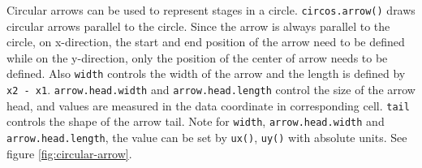 \documentclass[]{book}
\newenvironment{Shaded}{\begin{snugshade}}{\end{snugshade}}
\newcommand{\KeywordTok}[1]{\textcolor[rgb]{0.13,0.29,0.53}{\textbf{#1}}}
\newcommand{\DataTypeTok}[1]{\textcolor[rgb]{0.13,0.29,0.53}{#1}}
\newcommand{\DecValTok}[1]{\textcolor[rgb]{0.00,0.00,0.81}{#1}}
\newcommand{\FloatTok}[1]{\textcolor[rgb]{0.00,0.00,0.81}{#1}}
\newcommand{\StringTok}[1]{\textcolor[rgb]{0.31,0.60,0.02}{#1}}
\newcommand{\OtherTok}[1]{\textcolor[rgb]{0.56,0.35,0.01}{#1}}
\newcommand{\ControlFlowTok}[1]{\textcolor[rgb]{0.13,0.29,0.53}{\textbf{#1}}}
\newcommand{\OperatorTok}[1]{\textcolor[rgb]{0.81,0.36,0.00}{\textbf{#1}}}
\newcommand{\NormalTok}[1]{#1}
\theoremstyle{definition}
\theoremstyle{definition}
\theoremstyle{remark}
\begin{document}
Circular arrows can be used to represent stages in a circle.
\texttt{circos.arrow()} draws circular arrows parallel to the circle.
Since the arrow is always parallel to the circle, on x-direction, the
start and end position of the arrow need to be defined while on the
y-direction, only the position of the center of arrow needs to be
defined. Also \texttt{width} controls the width of the arrow and the
length is defined by \texttt{x2\ -\ x1}. \texttt{arrow.head.width} and
\texttt{arrow.head.length} control the size of the arrow head, and
values are measured in the data coordinate in corresponding cell.
\texttt{tail} controls the shape of the arrow tail. Note for
\texttt{width}, \texttt{arrow.head.width} and
\texttt{arrow.head.length}, the value can be set by \texttt{ux()},
\texttt{uy()} with absolute units. See figure \ref{fig:circular-arrow}.

\begin{Shaded}
\end{Shaded}
\end{document}
